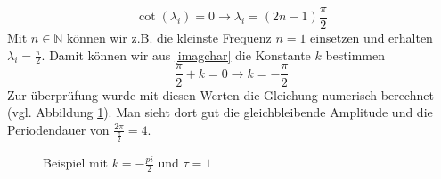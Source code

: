\begin{equation}
	\cot(\lambda_i) = 0 \longrightarrow \lambda_i = (2n-1)\frac{\pi}{2}
\end{equation}
Mit $n\in \mathbb{N}$ können wir z.B. die kleinste Frequenz $n=1$ einsetzen und erhalten $\lambda_i = \frac{\pi}{2}$.
Damit können wir aus \eqref{imagchar} die Konstante $k$ bestimmen
\begin{equation}
	\frac{\pi}{2} + k = 0 \longrightarrow k = -\frac{\pi}{2}
\end{equation}
Zur überprüfung wurde mit diesen Werten die Gleichung numerisch berechnet (vgl. Abbildung \ref{fig:bsp_chareq}).
Man sieht dort gut die gleichbleibende Amplitude und die Periodendauer von $\frac{2\pi}{\frac{\pi}{2}}=4$.

\begin{figure}
	\centering
	
	\caption{Beispiel mit $k=-\frac{pi}{2}$ und $\tau=1$}
	\label{fig:bsp_chareq}
\end{figure}
